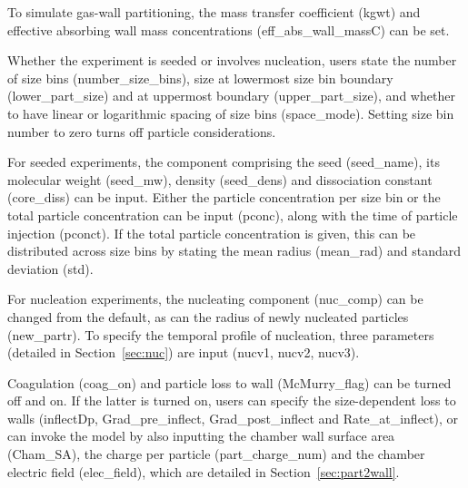 \documentclass[gmd, manuscript]{copernicus}
\begin{document}
To simulate gas-wall partitioning, the mass transfer coefficient (kgwt) and effective absorbing wall mass concentrations (eff\_abs\_wall\_massC) can be set.

Whether the experiment is seeded or involves nucleation, users state the number of size bins (number\_size\_bins), size at lowermost size bin boundary (lower\_part\_size) and at uppermost boundary (upper\_part\_size), and whether to have linear or logarithmic spacing of size bins (space\_mode).  Setting size bin number to zero turns off particle considerations.

For seeded experiments, the component comprising the seed (seed\_name), its molecular weight (seed\_mw), density (seed\_dens) and dissociation constant (core\_diss) can be input.  Either the particle concentration per size bin or the total particle concentration can be input (pconc), along with the time of particle injection (pconct).  If the total particle concentration is given, this can be distributed across size bins by stating the mean radius (mean\_rad) and standard deviation (std).

For nucleation experiments, the nucleating component (nuc\_comp) can be changed from the default, as can the radius of newly nucleated particles (new\_partr).  To specify the temporal profile of nucleation, three parameters (detailed in Section~\ref{sec:nuc}) are input (nucv1, nucv2, nucv3).

Coagulation (coag\_on) and particle loss to wall (McMurry\_flag) can be turned off and on.  If the latter is turned on, users can specify the size-dependent loss to walls (inflectDp, Grad\_pre\_inflect, Grad\_post\_inflect and Rate\_at\_inflect), or can invoke the \citet{McMurry1985} model by also inputting the chamber wall surface area (Cham\_SA), the charge per particle (part\_charge\_num) and the chamber electric field (elec\_field), which are detailed in Section~\ref{sec:part2wall}.
\end{document}
